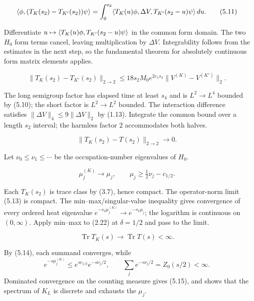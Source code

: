 \documentclass[11pt,a4paper]{article}
\newcommand{\Tr}{\operatorname{Tr}}
\begin{document}
\[
 \langle \phi,(T_K(s_2)-T_{K'}(s_2))\psi\rangle
 =\int_0^{s_2}
 \langle T_K(u)\phi,\Delta V,T_{K'}(s_2-u)\psi\rangle\,du.
\tag{5.11}
\]

\Because Differentiate
$u\mapsto\langle T_K(u)\phi,T_{K'}(s_2-u)\psi\rangle$ in the common form domain.
The two $H_0$ form terms cancel, leaving multiplication by $\Delta V$.
Integrability follows from the estimates in the next step, so the fundamental
theorem for absolutely continuous form matrix elements applies.

\[
 \|T_K(s_2)-T_{K'}(s_2)\|_{2\to2}
 \le18s_2M_0e^{2c_\lambda s_2}\|V^{(K)}-V^{(K')}\|_2.
\tag{5.12}
\]

\Because The long semigroup factor has elapsed time at least $s_4$ and is
$L^2\to L^4$ bounded by (5.10); the short factor is $L^2\to L^2$ bounded.
The interaction difference satisfies
$\|\Delta V\|_4\le9\|\Delta V\|_2$ by (1.13).  Integrate the common bound
over a length $s_2$ interval; the harmless factor $2$ accommodates both halves.

\[
 \|T_K(s_2)-T(s_2)\|_{2\to2}\to0.
\tag{5.13}
\]

\QedStep


Let $\nu_0\le\nu_1\le\cdots$ be the occupation-number eigenvalues of $H_0$.

\[
 \mu_j^{(K)}\to\mu_j,\qquad
 \mu_j\ge\tfrac12\nu_j-c_{1/2}.
\tag{5.14}
\]

\Because Each $T_K(s_2)$ is trace class by (3.7), hence compact.  The
operator-norm limit (5.13) is compact.  The min--max/singular-value inequality
gives convergence of every ordered heat eigenvalue
$e^{-s_2\mu_j^{(K)}}\to e^{-s_2\mu_j}$; the logarithm is continuous on
$(0,\infty)$.  Apply min--max to (2.22) at $\delta=1/2$ and pass to the
limit.

\[
 \Tr T_K(s)\to\Tr T(s)<\infty.
\tag{5.15}
\]

\Because By (5.14), each summand converges, while
\[
 e^{-s\mu_j^{(K)}}\le e^{sc_{1/2}}e^{-s\nu_j/2},\qquad
 \sum_je^{-s\nu_j/2}=Z_0(s/2)<\infty.
\]
Dominated convergence on the counting measure gives (5.15), and shows that the
spectrum of $K_L$ is discrete and exhausts the $\mu_j$.
\end{document}
